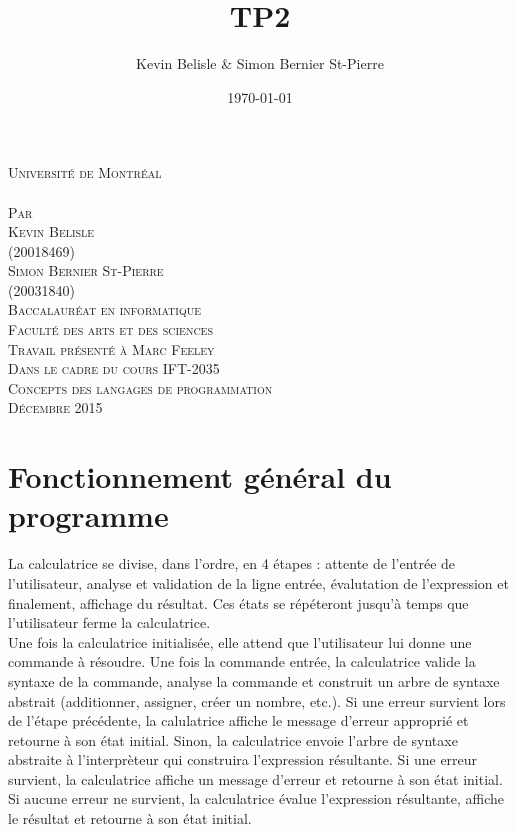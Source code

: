 \documentclass[a4paper,12pt,french]{article}
\date{\today}
\author{Kevin Belisle \& Simon Bernier St-Pierre}
\title{TP2}
\newcommand{\Teacher}{Marc Feeley}
\newcommand{\ClassNum}{IFT-2035}
\newcommand{\ClassName}{Concepts des langages de programmation}
\newcommand{\DateMMMMYYYY}{Décembre 2015}
\newcommand{\Author}{Kevin Belisle}
\newcommand{\Authorr}{Simon Bernier St-Pierre}
\begin{document}
	\begin{titlepage}
		\begin{center}
			\textsc{\normalsize Université de Montréal}\\[2.5cm]
			
			\textsc{\LARGE \@title}\\[2.5cm]
			
			\textsc{\small Par}\\[0.25cm]
			\textsc{\LARGE \Author}\\[0.25cm]
			\textsc{\normalsize (20018469)}\\[0.25cm]
			\textsc{\LARGE \Authorr}\\[0.25cm]
			\textsc{\normalsize (20031840)}\\[2.5cm]
			
			\textsc{\normalsize Baccalauréat en informatique}\\
			\textsc{\normalsize Faculté des arts et des sciences}\\[2.5cm]
			
			\textsc{\small Travail présenté à \Teacher}\\
			\textsc{\small Dans le cadre du cours \ClassNum}\\
			\textsc{\small \ClassName}\\[2.5cm]
			
			\textsc{\normalsize \DateMMMMYYYY}\\[1.5cm]
		\end{center}
	\end{titlepage}
	\section{Fonctionnement général du programme}
	La calculatrice se divise, dans l'ordre, en 4 étapes : attente de l'entrée de l'utilisateur, analyse et validation de la ligne entrée, évalutation de l'expression et finalement, affichage du résultat. Ces états se répéteront jusqu'à temps que l'utilisateur ferme la calculatrice.\\
	
	Une fois la calculatrice initialisée, elle attend que l'utilisateur lui donne une commande à résoudre. Une fois la commande entrée, la calculatrice valide la syntaxe de la commande, analyse la commande et construit un arbre de syntaxe abstrait (additionner,  assigner, créer un nombre, etc.). Si une erreur survient lors de l'étape précédente, la calulatrice affiche le message d'erreur approprié et retourne à son état initial. Sinon, la calculatrice envoie l'arbre de syntaxe abstraite à l'interprèteur qui construira l'expression résultante. Si une erreur survient, la calculatrice affiche un message d'erreur et retourne à son état initial. Si aucune erreur ne survient, la calculatrice évalue l'expression résultante, affiche le résultat et retourne à son état initial.
	\newpage
\end{document}
